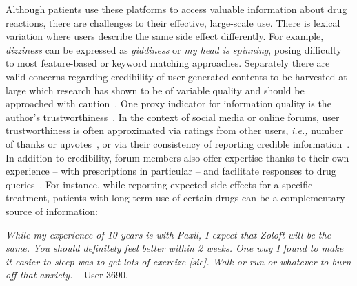 \documentclass{bmcart}
\begin{document}
Although patients use these platforms to access valuable information about drug reactions, there are challenges to their effective, large-scale use. There is lexical variation where users describe the same side effect differently.  For example, \textit{dizziness} can be expressed as
\textit{giddiness} or \textit{my head is spinning}, posing difficulty to most feature-based or keyword matching approaches. Separately there are valid concerns regarding credibility of user-generated contents to be harvested at large which research
has shown to be of variable quality and should be approached with caution~\cite{impicciatore1997reliability,peterson2003consumers,hajli2015credibility,poddar2019}. One proxy indicator for information quality is the author's trustworthiness~\cite{li2016survey}. In the context of social media or online forums, user trustworthiness is 
often approximated via ratings from other users, \textit{i.e.,} number of thanks or upvotes~\cite{rains2009health}, or via their consistency of reporting credible information~\cite{hoang2018authenticity,mukherjee2014people}. In addition to credibility, forum members also offer expertise thanks to their own experience -- with prescriptions in particular -- and facilitate responses to drug queries~\cite{vydiswaran2019identifying}. For instance, while reporting expected side effects for a specific treatment, patients with long-term use of certain drugs can be a complementary source of information:  %

{\footnotesize
{\it While my experience of 10 years is with Paxil, I expect that Zoloft will be the same. You should definitely feel better within 2 weeks. One way I found to make it easier to sleep was to get lots of exercize [sic]. Walk or run or whatever to burn off that anxiety.} -- User 3690.
}
\end{document}
